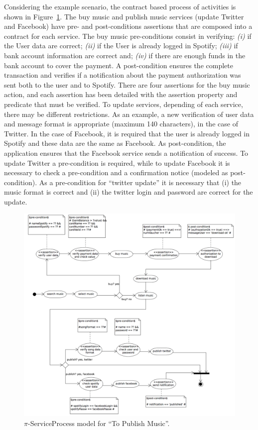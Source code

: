 \documentclass{singlecol-new}
\theoremstyle{TH}{
\newtheorem{lemma}{Lemma}
\newtheorem{theorem}[lemma]{Theorem}
\newtheorem{corrolary}[lemma]{Corrolary}
\newtheorem{conjecture}[lemma]{Conjecture}
\newtheorem{proposition}[lemma]{Proposition}
\newtheorem{claim}[lemma]{Claim}
\newtheorem{stheorem}[lemma]{Wrong Theorem}
\newtheorem{algorithm}{Algorithm}
}
\theoremstyle{THrm}{
\newtheorem{definition}{Definition}[section]
\newtheorem{question}{Question}[section]
\newtheorem{remark}{Remark}
\newtheorem{scheme}{Scheme}
}
\theoremstyle{THhit}{
\newtheorem{case}{Case}[section]
}
\theoremstyle{THhsl}{
\newtheorem{example}{Example}
}
\begin{document}
\begin{example}\label{ex:toPublicMusic3}
Considering the example scenario, the contract based process of activities  is shown in Figure~\ref{fig:CIM:serviceprocess}. The buy music and publish music services (update Twitter and Facebook) have pre- and post-conditions assertions that are composed into a contract for each service. The buy music pre-conditions consist in verifying:
\textit{(i)} if the User data are correct;
\textit{(ii)} if the User is already logged in Spotify;
\textit{(iii)} if bank account information are correct and;
\textit{(iv)} if there are enough funds in the bank account to cover the payment.
A post-condition ensures the complete transaction and verifies if a notification about the payment authorization was sent both to the user and to Spotify. 
There are four assertions for the buy music action, and each assertion has been detailed with the assertion property and predicate that must be verified. 
To update services, depending of each service, there may be different restrictions. As an example, a new verification of user data and message format is appropriate (maximum 140 characters), in the case of Twitter. In the case of Facebook, it is required that the user is already logged in Spotify and these data are the same as Facebook.
As post-condition, the application ensures that the Facebook service sends a notification of success.
To update Twitter a pre-condition is required, while to update Facebook it is necessary to check a pre-condition and a confirmation notice (modeled as post-condition).
As a pre-condition for ``twitter update'' it is necessary that (i) the music format is correct and (ii) the twitter login and password are correct for the update.
\end{example}

\begin{figure}[h]
\center
\includegraphics[width=1\textwidth]{./figures/ServiceProcess.pdf}
\caption{\label{fig:CIM:serviceprocess} $\pi$-ServiceProcess model for ``To Publish Music''.}
\end{figure}
\end{document}
